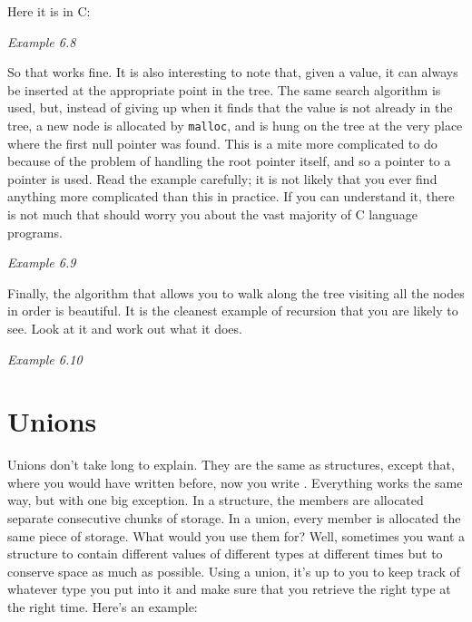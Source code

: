    Here it is in C:


   \begin{center}\textit{Example 6.8}\end{center}


   So that works fine. It is also interesting to note that, given a value,
    it can always be inserted at the appropriate point in the tree. The same
    search algorithm is used, but, instead of giving up when it finds that the
    value is not already in the tree, a new node is allocated by
    \texttt{malloc}, and is hung on the tree at the very place where the
    first null pointer was found. This is a mite more complicated to do because
    of the problem of handling the root pointer itself, and so a pointer to
    a pointer is used. Read the example carefully; it is not likely that you
    ever find anything more complicated than this in practice. If you can
    understand it, there is not much that should worry you about the vast
    majority of C language programs.


    \begin{center}\textit{Example 6.9}\end{center}


   Finally, the algorithm that allows you to walk along the tree visiting
    all the nodes in order is beautiful. It is the cleanest example of
    recursion that you are likely to see. Look at it and work out what it
    does.


    \begin{center}\textit{Example 6.10}\end{center}


  

 
        \section{Unions}
        

  

  Unions don't take long to explain. They are the same as structures, except
   that, where you would have written \struct{} before, now you write
   \union. Everything works the same way, but with one big
   exception. In a structure, the members are allocated separate consecutive
   chunks of storage. In a union, every member is allocated the same piece of
   storage. What would you use them for? Well, sometimes you want a structure
   to contain different values of different types at different times but to
   conserve space as much as possible. Using a union, it's up to you to keep
   track of whatever type you put into it and make sure that you retrieve the
   right type at the right time. Here's an example:


